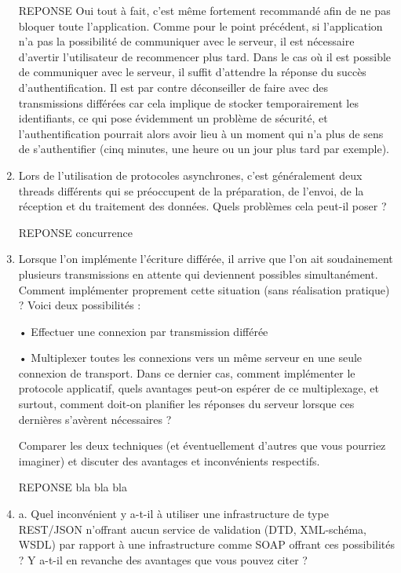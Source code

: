 \documentclass[a4paper]{article}
\begin{document}
\begin{enumerate}
    REPONSE
    Oui tout à fait, c'est même fortement recommandé afin de ne pas bloquer toute l'application. Comme pour le point précédent, si l'application n'a pas la possibilité de communiquer avec le serveur, il est nécessaire d'avertir l'utilisateur de recommencer plus tard. Dans le cas où il est possible de communiquer avec le serveur, il suffit d'attendre la réponse du succès d'authentification. Il est par contre déconseiller de faire avec des transmissions différées car cela implique de stocker temporairement les identifiants, ce qui pose évidemment un problème de sécurité, et l'authentification pourrait alors avoir lieu à un moment qui n'a plus de sens de s'authentifier (cinq minutes, une heure ou un jour plus tard par exemple).
    
    \item Lors de l'utilisation de protocoles asynchrones, c'est généralement deux threads différents qui se préoccupent de la préparation, de l'envoi, de la réception et du traitement des données. Quels problèmes cela peut-il poser ?
    
    REPONSE
    concurrence
    
    \item Lorsque l'on implémente l'écriture différée, il arrive que l'on ait soudainement plusieurs transmissions en attente qui deviennent possibles simultanément. Comment implémenter proprement cette situation (sans réalisation pratique) ? Voici deux possibilités :
    
    • Effectuer une connexion par transmission différée
    
    • Multiplexer toutes les connexions vers un même serveur en une seule connexion de transport.
    Dans ce dernier cas, comment implémenter le protocole applicatif, quels avantages peut-on
    espérer de ce multiplexage, et surtout, comment doit-on planifier les réponses du serveur
    lorsque ces dernières s'avèrent nécessaires ?
    
    Comparer les deux techniques (et éventuellement d'autres que vous pourriez imaginer) et discuter des avantages et inconvénients respectifs.
    
    REPONSE
    bla bla bla
    
    \item a. Quel inconvénient y a-t-il à utiliser une infrastructure de type REST/JSON n'offrant aucun
    service de validation (DTD, XML-schéma, WSDL) par rapport à une infrastructure comme SOAP
    offrant ces possibilités ? Y a-t-il en revanche des avantages que vous pouvez citer ?
    

\end{enumerate}
\end{document}
